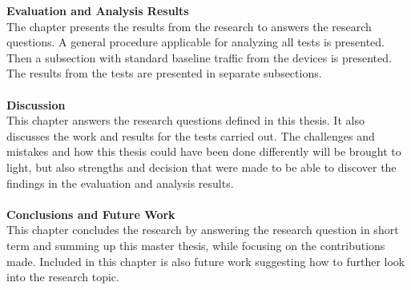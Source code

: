 \textbf{Evaluation and Analysis Results}
\\
The chapter presents the results from the research to answers the research questions. A general procedure applicable for analyzing all tests is presented. Then a subsection with standard baseline traffic from the devices is presented. The results from the tests are presented in separate subsections.  
\\\\
\textbf{Discussion}
\\
This chapter answers the research questions defined in this thesis. It also discusses the work and results for the tests carried out. The challenges and mistakes and how this thesis could have been done differently will be brought to light, but also strengths and decision that were made to be able to discover the findings in the evaluation and analysis results. 
\\\\
\textbf{Conclusions and Future Work}
\\
This chapter concludes the research by answering the research question in short term and summing up this master thesis, while focusing on the contributions made. Included in this chapter is also future work suggesting how to further look into the research topic.